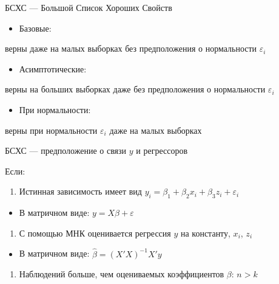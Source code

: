 \documentclass[ignorenonframetext,]{beamer}
\begin{document}
\begin{frame}{БСХС --- Большой Список Хороших Свойств}

\begin{itemize}
\itemsep1pt\parskip0pt
\item
  Базовые:
\end{itemize}

верны даже на малых выборках без предположения о нормальности
\(\varepsilon_i\)

\begin{itemize}
\itemsep1pt\parskip0pt
\item
  Асимптотические:
\end{itemize}

верны на больших выборках даже без предположения о нормальности
\(\varepsilon_i\)

\begin{itemize}
\itemsep1pt\parskip0pt
\item
  При нормальности:
\end{itemize}

верны при нормальности \(\varepsilon_i\) даже на малых выборках

\end{frame}

\begin{frame}{БСХС --- предположение о связи \(y\) и регрессоров}

Если:

\begin{enumerate}
\def\labelenumi{\arabic{enumi}.}
\itemsep1pt\parskip0pt
\item
  Истинная зависимость имеет вид
  \(y_i=\beta_1 + \beta_2 x_i + \beta_3 z_i+\varepsilon_i\)
\end{enumerate}

\begin{itemize}
\itemsep1pt\parskip0pt
\item
  В матричном виде: \(y=X\beta + \varepsilon\)
\end{itemize}

\begin{enumerate}
\def\labelenumi{\arabic{enumi}.}
\setcounter{enumi}{1}
\itemsep1pt\parskip0pt
\item
  С помощью МНК оценивается регрессия \(y\) на константу, \(x_i\),
  \(z_i\)
\end{enumerate}

\begin{itemize}
\itemsep1pt\parskip0pt
\item
  В матричном виде: \(\hat{\beta}=(X'X)^{-1}X'y\)
\end{itemize}

\begin{enumerate}
\def\labelenumi{\arabic{enumi}.}
\setcounter{enumi}{2}
\itemsep1pt\parskip0pt
\item
  Наблюдений больше, чем оцениваемых коэффициентов \(\beta\): \(n>k\)
\end{enumerate}

\end{frame}
\end{document}
